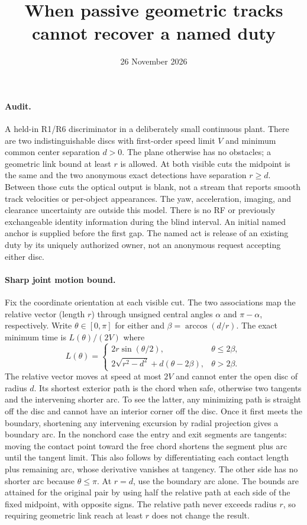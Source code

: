 \documentclass{article}
\title{When passive geometric tracks cannot recover a named duty}
\author{}
\date{26 November 2026}
\begin{document}
\maketitle
\paragraph{Audit.}
A held-in R1/R6 discriminator in a deliberately small continuous plant.
There are two indistinguishable discs with first-order speed limit $V$
and minimum common center separation $d>0$. The plane otherwise has
no obstacles; a geometric link bound at least $r$ is allowed. At both
visible cuts the midpoint is the same and the two anonymous exact
detections have separation $r\ge d$. Between those cuts the optical
output is blank, not a stream that reports smooth track velocities or
per-object appearances. The yaw, acceleration, imaging, and clearance
uncertainty are outside this model. There is no RF or previously
exchangeable identity information during the blind interval.
An initial named anchor is supplied before the first gap. The named
act is release of an existing duty by its uniquely authorized owner,
not an anonymous request accepting either disc.

\paragraph{Sharp joint motion bound.}
Fix the coordinate orientation at each visible cut. The two associations
map the relative vector (length $r$) through unsigned central angles
$\alpha$ and $\pi-\alpha$, respectively. Write $\theta\in[0,\pi]$
for either and $\beta=\arccos(d/r)$. The exact minimum time is
$L(\theta)/(2V)$ where
\[
 L(\theta)=
 \begin{cases}
 2r\sin(\theta/2),&\theta\le 2\beta,\\[2pt]
 2\sqrt{r^2-d^2}+d(\theta-2\beta),&\theta>2\beta .
 \end{cases}
\]
The relative vector moves at speed at most $2V$ and cannot enter the
open disc of radius $d$. Its shortest exterior path is the chord when
safe, otherwise two tangents and the intervening shorter arc. To see
the latter, any minimizing path is straight off the disc and cannot
have an interior corner off the disc. Once it first meets the boundary,
shortening any intervening excursion by radial projection gives a
boundary arc. In the nonchord case the entry and exit segments are
tangents: moving the contact point toward the free chord shortens the
segment plus arc until the tangent limit. This also follows by
differentiating each contact length plus remaining arc, whose
derivative vanishes at tangency. The other side has no shorter arc
because $\theta\le\pi$. At $r=d$, use the boundary arc alone.
The bounds are attained for the original pair by using half the
relative path at each side of the fixed midpoint, with opposite signs.
The relative path never exceeds radius $r$, so requiring geometric
link reach at least $r$ does not change the result.
\end{document}
